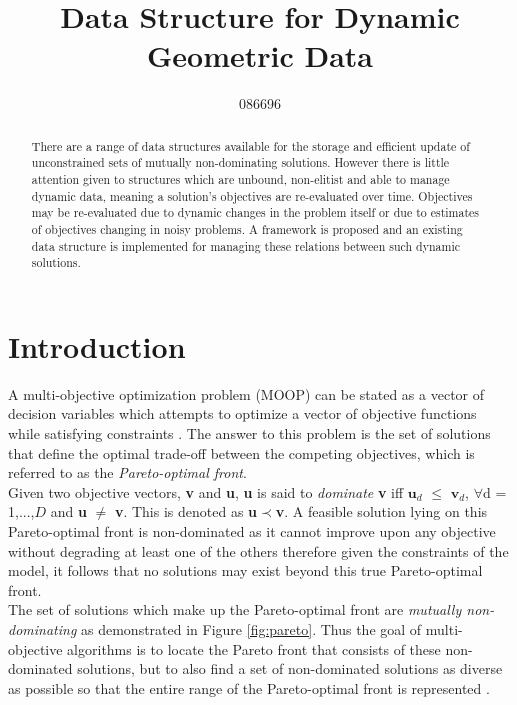\documentclass{ecmm427_assignment}
\begin{document}
\title{Data Structure for Dynamic Geometric Data}
\author{086696}
\maketitle

\begin{abstract}
\centering
There are a range of data structures available for the storage and efficient update of unconstrained sets of mutually non-dominating solutions. However there is little attention given to structures which are unbound, non-elitist and able to manage dynamic data, meaning a solution's objectives are re-evaluated over time. Objectives may be re-evaluated due to dynamic changes in the problem itself or due to estimates of objectives changing in noisy problems. A framework is proposed and an existing data structure is implemented for managing these relations between such dynamic solutions.
\end{abstract}

\null
\vfill
\declaration

\newpage %
\tableofcontents
\newpage

\section{Introduction}
A multi-objective optimization problem (MOOP) can be stated as a vector of decision variables which attempts to optimize a vector of objective functions while satisfying constraints \cite{Altwaijry2012}. The answer to this problem is the set of solutions that define the optimal trade-off between the competing objectives, which is referred to as the \textsl{Pareto-optimal front}.\\
Given two objective vectors, \textbf{v} and \textbf{u}, \textbf{u} is said to \textsl{dominate} \textbf{v} iff $\textbf{u}_d$ $\leq$ $\textbf{v}_d$, $\forall$d = 1,...,$D$ and \textbf{u} $\neq$ \textbf{v}. This is denoted as \textbf{u}$\prec$\textbf{v}. A feasible solution lying on this Pareto-optimal front is non-dominated as it cannot improve upon any objective without degrading at least one of the others therefore given the constraints of the model, it follows that no solutions may exist beyond this true Pareto-optimal front. \\
The set of solutions which make up the Pareto-optimal front are \textsl{mutually non-dominating} \cite{Fieldsend2014} as demonstrated in Figure \ref{fig:pareto}. Thus the goal of multi-objective algorithms is to locate the Pareto front that consists of these non-dominated solutions, but to also find a set of non-dominated solutions as diverse as possible so that the entire range of the Pareto-optimal front is represented \cite{Fieldsend2003} \cite{Deb2011}.
\end{document}
